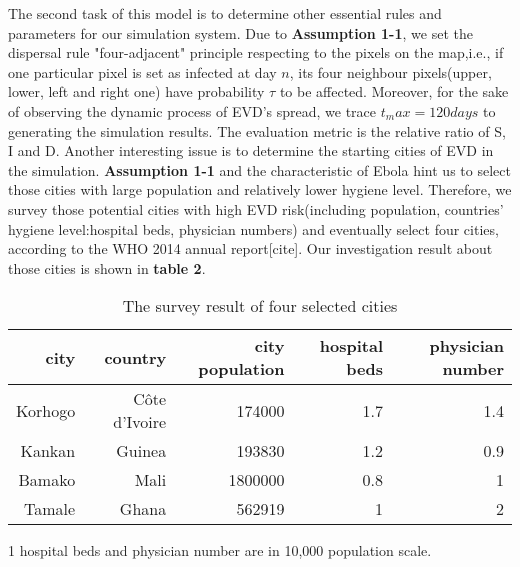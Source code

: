 The second task of this model is to determine other essential rules and parameters for our simulation system. Due to \textbf{Assumption 1-1}, we set the dispersal rule "four-adjacent" principle respecting to the pixels on the map,i.e., if one particular pixel is set as infected at day $n$, its four neighbour pixels(upper, lower, left and right one) have probability $\tau$ to be affected. Moreover, for the sake of observing the dynamic process of EVD's spread, we trace $t_max=120days$ to generating the simulation results. The evaluation metric is the relative ratio of S, I and D. Another interesting issue is to determine the starting cities of EVD in the simulation. \textbf{Assumption 1-1} and the characteristic of Ebola hint us to select those cities with large population and relatively lower hygiene level. Therefore, we survey those potential cities with high EVD risk(including population, countries' hygiene level:hospital beds, physician numbers) and eventually select four cities, according to the WHO 2014 annual report[cite]. Our investigation result about those cities is shown in \textbf{table 2}.
\begin{table}[htbp]
\centering
\caption{The survey result of four selected cities}
\begin{tabular}{|r|r|r|r|r|}
\hline
{\bf city} & {\bf country} & {\bf city population} & {\bf hospital beds\tnote{1}} & {\bf physician number\tnote{2}} \\
\hline
   Korhogo & Côte d'Ivoire &     174000 &        1.7 &        1.4 \\
\hline
    Kankan &     Guinea &     193830 &        1.2 &        0.9 \\
\hline
    Bamako &       Mali &    1800000 &        0.8 &          1 \\
\hline
    Tamale &      Ghana &     562919 &          1 &          2 \\
\hline
\end{tabular}  
\begin{tablenotes}
        \footnotesize
        \item[1] hospital beds and physician number are in 10,000 population scale.
\end{tablenotes}

\end{table}


